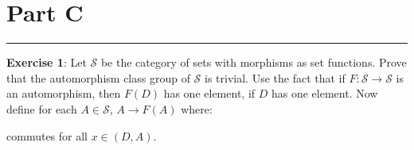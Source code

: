 \documentclass{article}
\begin{document}
\section*{Part C}
\hrule
\textbf{Exercise 1}: Let $\mathcal{S}$ be the category of sets with morphisms as set functions. Prove that the automorphism class group of $\mathcal{S}$ is trivial. Use the fact that if $F: \mathcal{S} \rightarrow \mathcal{S}$ is an automorphism, then $F(D)$ has one element, if $D$ has one element. Now define for each $A \in \mathcal{S}$, $A \rightarrow F(A)$ where:
    \begin{center}
    \end{center}
commutes for all $x \in (D, A)$.
\end{document}

